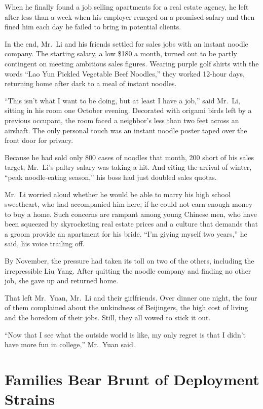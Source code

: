 ﻿\documentclass[12pt]{article}
\begin{document}
When he finally found a job selling apartments for a real estate agency, he left after less than a
week when his employer reneged on a promised salary and then fined him each day he failed to bring
in potential clients.

In the end, Mr.~Li and his friends settled for sales jobs with an instant noodle company. The
starting salary, a low \$180 a month, turned out to be partly contingent on meeting ambitious sales
figures. Wearing purple golf shirts with the words ``Lao Yun Pickled Vegetable Beef Noodles,'' they
worked 12-hour days, returning home after dark to a meal of instant noodles.

``This isn't what I want to be doing, but at least I have a job,'' said Mr.~Li, sitting in his room
one October evening. Decorated with origami birds left by a previous occupant, the room faced a
neighbor's less than two feet across an airshaft. The only personal touch was an instant noodle
poster taped over the front door for privacy.

Because he had sold only 800 cases of noodles that month, 200 short of his sales target, Mr.~Li's
paltry salary was taking a hit. And citing the arrival of winter, ``peak noodle-eating season,'' his
boss had just doubled sales quotas.

Mr.~Li worried aloud whether he would be able to marry his high school sweetheart, who had
accompanied him here, if he could not earn enough money to buy a home. Such concerns are rampant
among young Chinese men, who have been squeezed by skyrocketing real estate prices and a culture
that demands that a groom provide an apartment for his bride. ``I'm giving myself two years,'' he
said, his voice trailing off.

By November, the pressure had taken its toll on two of the others, including the irrepressible Liu
Yang. After quitting the noodle company and finding no other job, she gave up and returned home.

That left Mr.~Yuan, Mr.~Li and their girlfriends. Over dinner one night, the four of them complained
about the unkindness of Beijingers, the high cost of living and the boredom of their jobs. Still,
they all vowed to stick it out.

``Now that I see what the outside world is like, my only regret is that I didn't have more fun in
college,'' Mr.~Yuan said.

\section{Families Bear Brunt of Deployment Strains}
\end{document}
